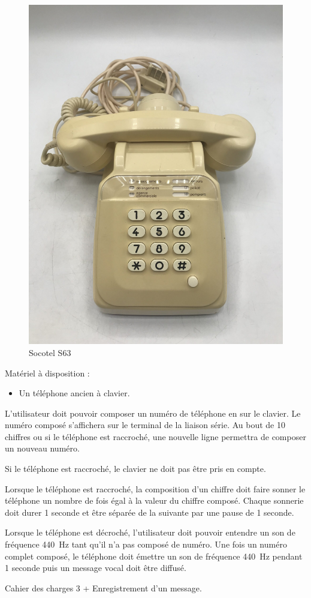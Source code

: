 \documentclass[TP, noCustomPackages]{UPSTI_Document}
\begin{document}
\begin{figure}[h!bt]
    \centering
    \includegraphics[width=.4\textwidth, trim= 0mm 10mm 0mm 100mm, clip]{images/telephone-Socotel-S63.jpg}
    \caption{Socotel S63}
\end{figure}


Matériel à disposition : 
\begin{itemize}
    \item Un téléphone ancien à clavier. 
\end{itemize}

\begin{UPSTIactivite}
    L'utilisateur doit pouvoir composer un numéro de téléphone en sur le clavier. Le numéro composé s'affichera sur le terminal de la liaison série. Au bout de 10 chiffres ou si le téléphone est raccroché, une nouvelle ligne permettra de composer un nouveau numéro.

    Si le téléphone est raccroché, le clavier ne doit pas être pris en compte.
\end{UPSTIactivite}

\begin{UPSTIactivite}
    Lorsque le téléphone est raccroché, la composition d'un chiffre doit faire sonner le téléphone un nombre de fois égal à la valeur du chiffre composé.
    Chaque sonnerie doit durer 1 seconde et être séparée de la suivante par une pause de 1 seconde.
\end{UPSTIactivite}

\begin{UPSTIactivite}
    Lorsque le téléphone est décroché, l'utilisateur doit pouvoir entendre un son de fréquence \SI{440}{Hz} tant qu'il n'a pas composé de numéro.
    Une fois un numéro complet composé, le téléphone doit émettre un son de fréquence \SI{440}{Hz} pendant 1 seconde puis un message vocal doit être diffusé.
\end{UPSTIactivite}

\begin{UPSTIactivite}
    Cahier des charges 3 + Enregistrement d'un message. 
\end{UPSTIactivite}
\end{document}
